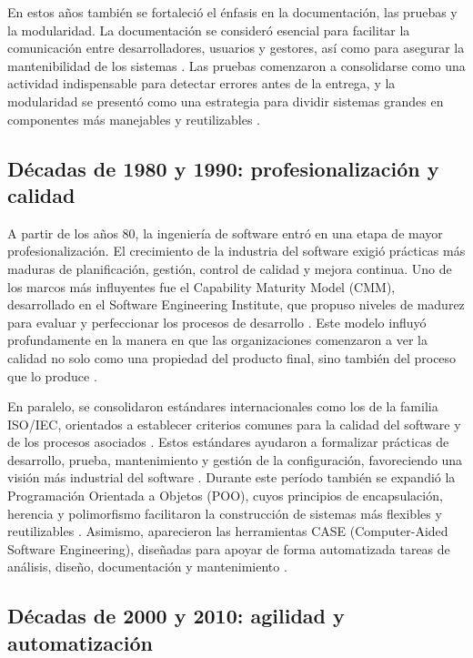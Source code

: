 En estos años también se fortaleció el énfasis en la documentación, las pruebas y la modularidad. La documentación se consideró esencial para facilitar la comunicación entre desarrolladores, usuarios y gestores, así como para asegurar la mantenibilidad de los sistemas \cite{sommerville2016}. Las pruebas comenzaron a consolidarse como una actividad indispensable para detectar errores antes de la entrega, y la modularidad se presentó como una estrategia para dividir sistemas grandes en componentes más manejables y reutilizables \cite{parnas1972}.

\subsection{Décadas de 1980 y 1990: profesionalización y calidad}

A partir de los años 80, la ingeniería de software entró en una etapa de mayor profesionalización. El crecimiento de la industria del software exigió prácticas más maduras de planificación, gestión, control de calidad y mejora continua. Uno de los marcos más influyentes fue el Capability Maturity Model (CMM), desarrollado en el Software Engineering Institute, que propuso niveles de madurez para evaluar y perfeccionar los procesos de desarrollo \cite{paulk1993}. Este modelo influyó profundamente en la manera en que las organizaciones comenzaron a ver la calidad no solo como una propiedad del producto final, sino también del proceso que lo produce \cite{humphrey1989}.

En paralelo, se consolidaron estándares internacionales como los de la familia ISO/IEC, orientados a establecer criterios comunes para la calidad del software y de los procesos asociados \cite{iso12207}. Estos estándares ayudaron a formalizar prácticas de desarrollo, prueba, mantenimiento y gestión de la configuración, favoreciendo una visión más industrial del software \cite{sommerville2016}. Durante este período también se expandió la Programación Orientada a Objetos (POO), cuyos principios de encapsulación, herencia y polimorfismo facilitaron la construcción de sistemas más flexibles y reutilizables \cite{booch1994}. Asimismo, aparecieron las herramientas CASE (Computer-Aided Software Engineering), diseñadas para apoyar de forma automatizada tareas de análisis, diseño, documentación y mantenimiento \cite{pressman2020}.

\subsection{Décadas de 2000 y 2010: agilidad y automatización}

